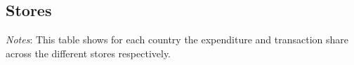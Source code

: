 \subsection{Stores}
\begin{table}[H]
	\centering		
	\caption{Stores: Overview}
    \label{tab: app_data_stores_overview}
	\begin{spacing}{1.1}
    \end{spacing}
    \parbox{\textwidth}{
        \begin{spacing}{1} 
            {\footnotesize 
            \textit{Notes}: This table shows for each country the expenditure and transaction share across the different stores respectively.}
        \end{spacing}}
\end{table}